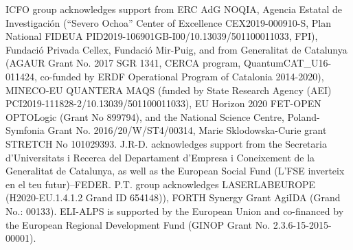 %
%

\begin{acknowledgements}
ICFO group acknowledges support from ERC AdG NOQIA, Agencia Estatal de Investigaci\'on (``Severo Ochoa'' Center of Excellence CEX2019-000910-S, Plan National FIDEUA
PID2019-106901GB-I00/10.13039/501100011033, FPI), Fundació Privada Cellex, Fundació Mir-Puig, and from Generalitat de Catalunya (AGAUR Grant No. 2017 SGR 1341, CERCA program, QuantumCAT\_U16-011424, co-funded by ERDF Operational Program of Catalonia 2014-2020), MINECO-EU QUANTERA MAQS (funded by State Research Agency (AEI) PCI2019-111828-2/10.13039/501100011033), EU Horizon 2020 FET-OPEN OPTOLogic (Grant No 899794), and the National Science Centre, Poland-Symfonia Grant No. 2016/20/W/ST4/00314, Marie Sklodowska-Curie grant STRETCH No 101029393. J.R-D. acknowledges support from the Secretaria d'Universitats i Recerca del Departament d'Empresa i Coneixement de la Generalitat de Catalunya, as well as the European Social Fund (L'FSE inverteix en el teu futur)--FEDER. P.T. group acknowledges LASERLABEUROPE (H2020-EU.1.4.1.2 Grand ID 654148)), FORTH Synergy Grant AgiIDA (Grand No.: 00133). ELI-ALPS is supported by the European Union and co-financed by the European Regional Development Fund (GINOP Grant No. 2.3.6-15-2015-00001).
\end{acknowledgements}


